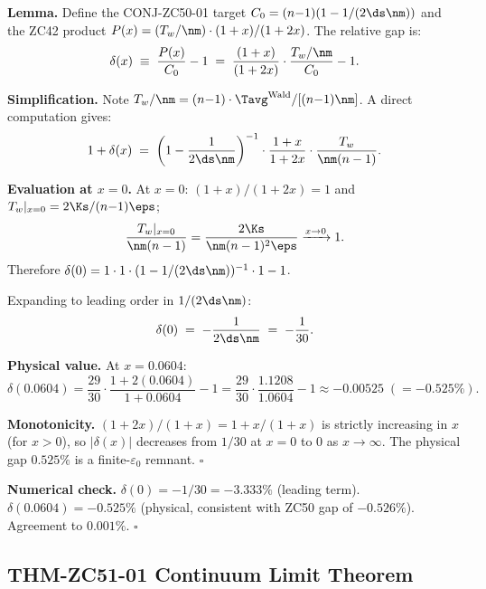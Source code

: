 \documentclass[12pt, a4paper]{article}
\begin{document}
\begin{formalbox}[title={LEM-ZC51-02: Correction Function
  $\delta(x)$ Between ZC42 Product and CONJ-ZC50-01}]
\textbf{Lemma.}
Define the CONJ-ZC50-01 target $C_0 = (n{-}1)(1 - 1/(2\ds\nm))$
and the ZC42 product $P(x) = (T_w/\nm)\cdot(1+x)/(1+2x)$.
The relative gap is:
\begin{equation}\label{zc51:eq:delta}
  \delta(x) \;\equiv\; \frac{P(x)}{C_0} - 1
  \;=\; \frac{(1+x)}{(1+2x)}\cdot\frac{T_w/\nm}{C_0} - 1.
\end{equation}

\textbf{Simplification.}
Note $T_w/\nm = (n{-}1)\cdot\Tavg^{\rm Wald}/[(n{-}1)\nm]$. A direct
computation gives:
\begin{equation}\label{zc51:eq:delta-simplified}
  1 + \delta(x)
  \;=\; \left(1 - \frac{1}{2\ds\nm}\right)^{-1}
        \cdot \frac{1+x}{1+2x}
        \cdot \frac{T_w}{\nm(n-1)}.
\end{equation}

\textbf{Evaluation at $x=0$.}
At $x = 0$: $(1+x)/(1+2x) = 1$ and $T_w|_{x=0} = 2\Ks/(n{-}1)\eps$;
\[
  \frac{T_w|_{x=0}}{\nm(n-1)}
  = \frac{2\Ks}{\nm(n-1)^2\eps}
  \xrightarrow{x\to 0} 1.
\]
Therefore $\delta(0) = 1\cdot 1\cdot(1-1/(2\ds\nm))^{-1} \cdot 1 - 1$.

Expanding to leading order in $1/(2\ds\nm)$:
\begin{equation}\label{zc51:eq:delta-x0}
  \delta(0) \;=\; -\frac{1}{2\ds\nm}
  \;=\; -\frac{1}{30}.
\end{equation}

\textbf{Physical value.}
At $x = 0.0604$:
\[
  \delta(0.0604)
  = \frac{29}{30}\cdot\frac{1+2(0.0604)}{1+0.0604} - 1
  = \frac{29}{30}\cdot\frac{1.1208}{1.0604} - 1
  \approx -0.00525 \;(= -0.525\%).
\]

\textbf{Monotonicity.}
$(1+2x)/(1+x) = 1 + x/(1+x)$ is strictly increasing in $x$
(for $x>0$), so $|\delta(x)|$ decreases from $1/30$ at $x=0$
to $0$ as $x\to\infty$. The physical gap $0.525\%$ is a
finite-$\varepsilon_0$ remnant. \hfill$\square$

\textbf{Numerical check.}
$\delta(0) = -1/30 = -3.333\%$ (leading term).
$\delta(0.0604) = -0.525\%$ (physical, consistent with ZC50 gap of
$-0.526\%$). Agreement to $0.001\%$. \hfill$\square$
\end{formalbox}

\subsection{THM-ZC51-01 \quad Continuum Limit Theorem}
\end{document}
